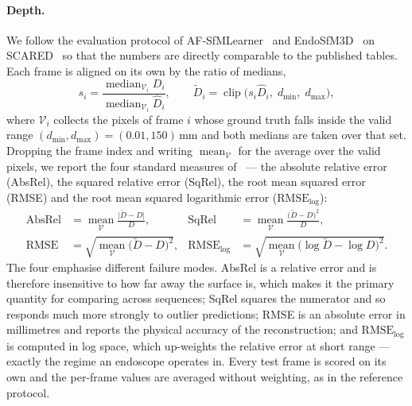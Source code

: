\documentclass[11pt]{article}
\begin{document}
\paragraph{Depth.}
We follow the evaluation protocol of AF-SfMLearner~\cite{shao2022afsfmlearner} and
EndoSfM3D~\cite{zhang2026endosfm3d} on SCARED~\cite{allan2021scared} so that the numbers
are directly comparable to the published tables. Each frame is aligned on its own by the ratio
of medians,
\begin{equation}
  s_i = \frac{\operatorname{median}_{\mathcal{V}_i} D_i}{\operatorname{median}_{\mathcal{V}_i} \hat{D}_i},
  \qquad
  \tilde{D}_i = \operatorname{clip}\big( s_i \hat{D}_i,\; d_{\min},\; d_{\max} \big),
\end{equation}
where $\mathcal{V}_i$ collects the pixels of frame $i$ whose ground truth falls inside the valid
range $(d_{\min}, d_{\max}) = (0.01, 150)$\,mm and both medians are taken over that set. Dropping
the frame index and writing $\operatorname{mean}_{\mathcal{V}}$ for the average over the valid
pixels, we report the four standard measures of~\cite{eigen2014depth} --- the absolute
relative error (AbsRel), the squared relative error (SqRel), the root mean squared error (RMSE)
and the root mean squared logarithmic error ($\text{RMSE}_{\log}$):
\begin{align}
  \text{AbsRel}
    &= \operatorname*{mean}_{\mathcal{V}}
       \frac{\big| \tilde{D} - D \big|}{D},
  &\text{SqRel}
    &= \operatorname*{mean}_{\mathcal{V}}
       \frac{\big( \tilde{D} - D \big)^{2}}{D}, \\[4pt]
  \text{RMSE}
    &= \sqrt{ \operatorname*{mean}_{\mathcal{V}}
       \big( \tilde{D} - D \big)^{2} },
  &\text{RMSE}_{\log}
    &= \sqrt{ \operatorname*{mean}_{\mathcal{V}}
       \big( \log \tilde{D} - \log D \big)^{2} } .
\end{align}
The four emphasise different failure modes. AbsRel is a relative error and is therefore
insensitive to how far away the surface is, which makes it the primary quantity for comparing
across sequences; SqRel squares the numerator and so responds much more strongly to outlier
predictions; RMSE is an absolute error in millimetres and reports the physical accuracy of the
reconstruction; and $\text{RMSE}_{\log}$ is computed in log space, which up-weights the relative
error at short range --- exactly the regime an endoscope operates in. Every test frame is scored
on its own and the per-frame values are averaged without weighting, as in the reference protocol.
\end{document}
